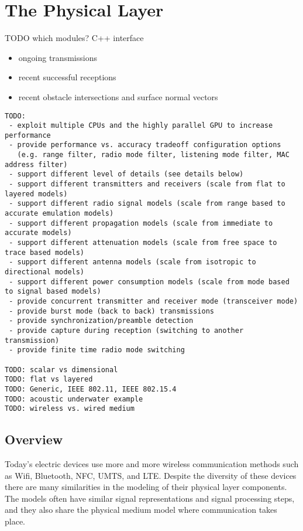 \chapter{The Physical Layer}
\label{cha:physicallayer}

TODO which modules? C++ interface

\begin{itemize}
  \item ongoing transmissions
  \item recent successful receptions
  \item recent obstacle intersections and surface normal vectors
\end{itemize}

\begin{verbatim}
TODO:
 - exploit multiple CPUs and the highly parallel GPU to increase performance
 - provide performance vs. accuracy tradeoff configuration options
   (e.g. range filter, radio mode filter, listening mode filter, MAC address filter)
 - support different level of details (see details below)
 - support different transmitters and receivers (scale from flat to layered models)
 - support different radio signal models (scale from range based to accurate emulation models)
 - support different propagation models (scale from immediate to accurate models)
 - support different attenuation models (scale from free space to trace based models)
 - support different antenna models (scale from isotropic to directional models)
 - support different power consumption models (scale from mode based to signal based models)
 - provide concurrent transmitter and receiver mode (transceiver mode)
 - provide burst mode (back to back) transmissions
 - provide synchronization/preamble detection
 - provide capture during reception (switching to another transmission)
 - provide finite time radio mode switching

TODO: scalar vs dimensional
TODO: flat vs layered
TODO: Generic, IEEE 802.11, IEEE 802.15.4
TODO: acoustic underwater example
TODO: wireless vs. wired medium

\end{verbatim}

\section{Overview}

Today's electric devices use more and more wireless communication methods such
as Wifi, Bluetooth, NFC, UMTS, and LTE. Despite the diversity of these devices
there are many similarities in the modeling of their physical layer components.
The models often have similar signal representations and signal processing steps,
and they also share the physical medium model where communication takes place.

